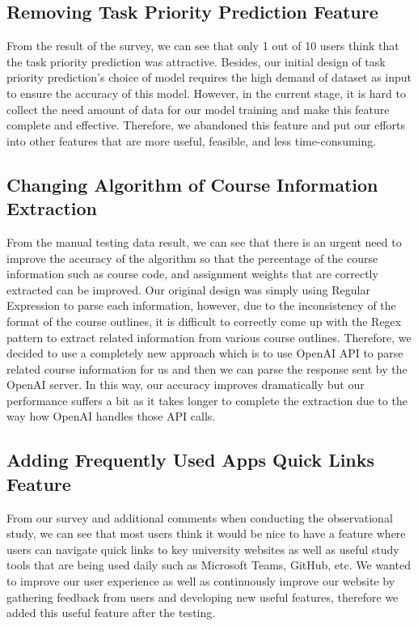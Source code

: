 \documentclass[12pt, titlepage]{article}
\begin{document}


\subsection{Removing Task Priority Prediction Feature}\label{TPPD}
From the result of the survey, we can see that only 1 out of 10 users think that the task priority prediction was attractive. Besides, our initial design of task priority prediction's choice of model requires the high demand of dataset as input to ensure the accuracy of this model. However, in the current stage, it is hard to collect the need amount of data for our model training and make this feature complete and effective. Therefore, we abandoned this feature and put our efforts into other features that are more useful, feasible, and less time-consuming.


\subsection{Changing Algorithm of Course Information Extraction}\label{CIEN}
From the manual testing data result, we can see that there is an urgent need to improve the accuracy of the algorithm so that the percentage of the course information such as course code, and assignment weights that are correctly extracted can be improved. Our original design was simply using Regular Expression to parse each information, however, due to the inconsistency of the format of the course outlines, it is difficult to correctly come up with the Regex pattern to extract related information from various course outlines. Therefore, we decided to use a completely new approach which is to use OpenAI API to parse related course information for us and then we can parse the response sent by the OpenAI server. In this way, our accuracy improves dramatically but our performance suffers a bit as it takes longer to complete the extraction due to the way how OpenAI handles those API calls.


\subsection{Adding Frequently Used Apps Quick Links Feature}\label{IAQL}
From our survey and additional comments when conducting the observational study, we can see that most users think it would be nice to have a feature where users can navigate quick links to key university websites as well as useful study tools that are being used daily such as Microsoft Teams, GitHub, etc. We wanted to improve our user experience as well as continuously improve our website by gathering feedback from users and developing new useful features, therefore we added this useful feature after the testing.
\end{document}
